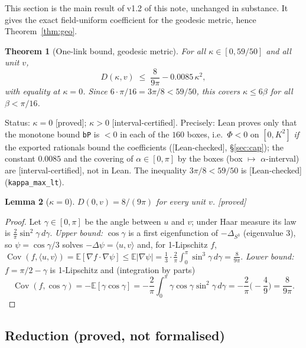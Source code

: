 \documentclass[11pt,a4paper]{article}
\newtheorem{theorem}{Theorem}
\newtheorem{lemma}[theorem]{Lemma}
\theoremstyle{remark}
\theoremstyle{definition}
\theoremstyle{plain}
\theoremstyle{remark}
\newcommand{\E}{\mathbb{E}}
\newcommand{\Cov}{\operatorname{Cov}}
\newcommand{\st}[1]{\textsf{[#1]}}
\begin{document}
This section is the main result of v1.2 of this note, unchanged in substance. It gives the exact
field-uniform coefficient for the geodesic metric, hence Theorem~\ref{thm:geo}.

\begin{theorem}[One-link bound, geodesic metric]\label{thm:onelink}
For all $\kappa\in[0,59/50]$ and all unit $v$,
\[
D(\kappa,v)\;\le\;\frac{8}{9\pi}-0.0085\,\kappa^2 ,
\]
with equality at $\kappa=0$. Since $6\cdot\pi/16=3\pi/8<59/50$, this covers $\kappa\le6\beta$ for all
$\beta<\pi/16$.
\end{theorem}
\noindent Status: $\kappa=0$ \st{proved}; $\kappa>0$ \st{interval-certified}. Precisely: Lean proves only
that the monotone bound \texttt{bP} is $<0$ in each of the $160$ boxes, i.e.\ $\Phi<0$ on $[0,K^2]$
\emph{if} the exported rationals bound the coefficients (\st{Lean-checked}, \S\ref{sec:cap}); the
constant $0.0085$ and the covering of $\alpha\in[0,\pi]$ by the boxes (box $\mapsto$ $\alpha$-interval) are
\st{interval-certified}, not in Lean. The inequality $3\pi/8<59/50$ is \st{Lean-checked}
(\texttt{kappa\_max\_lt}).

\begin{lemma}[$\kappa=0$]\label{lem:zero}
$D(0,v)=8/(9\pi)$ for every unit $v$. \st{proved}
\end{lemma}
\begin{proof}
Let $\gamma\in[0,\pi]$ be the angle between $u$ and $v$; under Haar measure its law is
$\frac2\pi\sin^2\gamma\,d\gamma$. \emph{Upper bound:} $\cos\gamma$ is a first eigenfunction of
$-\Delta_{S^3}$ (eigenvalue $3$), so $\psi=\cos\gamma/3$ solves $-\Delta\psi=\langle u,v\rangle$ and, for
1-Lipschitz $f$, $\Cov(f,\langle u,v\rangle)=\E[\nabla f\cdot\nabla\psi]\le\E|\nabla\psi|
=\frac13\cdot\frac2\pi\int_0^\pi\sin^3\gamma\,d\gamma=\frac{8}{9\pi}$.
\emph{Lower bound:} $f=\pi/2-\gamma$ is 1-Lipschitz and (integration by parts)
\[
\Cov(f,\cos\gamma)=-\E[\gamma\cos\gamma]=-\frac2\pi\int_0^\pi\gamma\cos\gamma\sin^2\gamma\,d\gamma
=-\frac2\pi\Big(-\frac49\Big)=\frac{8}{9\pi}.
\]
\end{proof}

\subsection{Reduction (proved, not formalised)}\label{sec:reduction}
\end{document}

